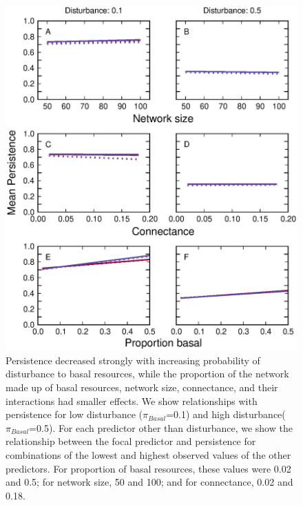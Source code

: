 \documentclass[12pt]{article}
\begin{document}
\begin{spacing}{2.0}
        \begin{figure}[h!]
            \centering
            \includegraphics[height=0.75\textheight]{figures/persistence_vs_BSC_lm.eps}
            \caption{Persistence decreased strongly with increasing probability of disturbance to basal resources, while the proportion of the network made up of basal resources, network size, connectance, and their interactions had smaller effects. We show relationships with persistence for low disturbance ($\pi_{Basal}$=0.1) and high disturbance($\pi_{Basal}$=0.5). For each predictor other than disturbance, we show the relationship between the focal predictor and persistence for combinations of the lowest and highest observed values of the other predictors. For proportion of basal resources, these values were 0.02 and 0.5; for network size, 50 and 100; and for connectance, 0.02 and 0.18.}
            \label{fig:lm_BCS}
        \end{figure}
    

       
    

\end{spacing}
\end{document}
